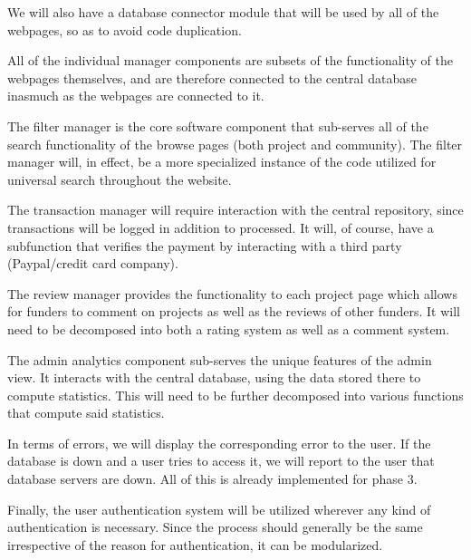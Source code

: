 \documentclass[12pt]{article}
\begin{document}
\begin{enumerate}
We will also have a database connector module that will be used by all of the webpages, so as to avoid code duplication.

All of the individual manager components are subsets of the functionality of the webpages themselves, and are therefore connected to the central database inasmuch as the webpages are connected to it.

The filter manager is the core software component that sub-serves all of the search functionality of the browse pages (both project and community). The filter manager will, in effect, be a more specialized instance of the code utilized for universal search throughout the website.

The transaction manager will require interaction with the central repository, since transactions will be logged in addition to processed. It will, of course, have a subfunction that verifies the payment by interacting with a third party (Paypal/credit card company).

The review manager provides the functionality to each project page which allows for funders to comment on projects as well as the reviews of other funders. It will need to be decomposed into both a rating system as well as a comment system.

The admin analytics component sub-serves the unique features of the admin view. It interacts with the central database, using the data stored there to compute statistics. This will need to be further decomposed into various functions that compute said statistics.

In terms of errors, we will display the corresponding error to the user. If the database is down and a user tries to access it, we will report to the user that database servers are down. All of this is already implemented for phase 3.


Finally, the user authentication system will be utilized wherever any kind of authentication is necessary. Since the process should generally be the same irrespective of the reason for authentication, it can be modularized.



\end{enumerate}
\end{document}
